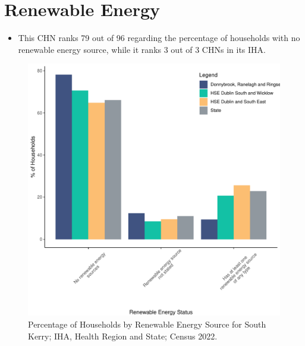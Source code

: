 \documentclass{article}
\begin{document}
\section{Renewable Energy}\label{sect:RE}
\begin{itemize}
\item This CHN ranks  79 out of 96 regarding the percentage of households with no renewable energy source, while it ranks   3 out of 3 CHNs in its IHA.
\end{itemize}
\begin{figure}[H]
	\centering
	\includegraphics[width = 140mm]{../figures/RenewableEnergyED.pdf}
	\caption{Percentage of Households by Renewable Energy Source for South Kerry; IHA, Health Region and State; Census 2022.}
	\label{fig:vbnv}
	\end{figure}
\end{document}
